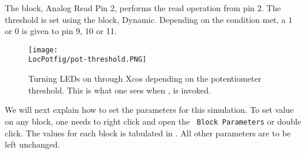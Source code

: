 The block, Analog Read Pin 2, performs the read operation from pin 2. The threshold is set using the block, Dynamic. Depending on the condition met, a $1$ or $0$ is given to pin 9, 10 or 11.
\begin{figure}
  \centering
  \texttt{[image: \\LocPotfig/pot-threshold.PNG]}
  \caption[Turning LEDs on through Xcos depending on the potentiometer
  threshold]{Turning LEDs on through Xcos depending on the
    potentiometer threshold.  This is what one sees when
      , is invoked.}
  \label{fig:pot-threshold}
\end{figure}

We will next explain how to set the parameters for this simulation.
To set value on any block, one needs to right click and open the {\tt
  Block Parameters} or double click.  The values for each block is
tabulated in .  All other parameters are to
be left unchanged.
